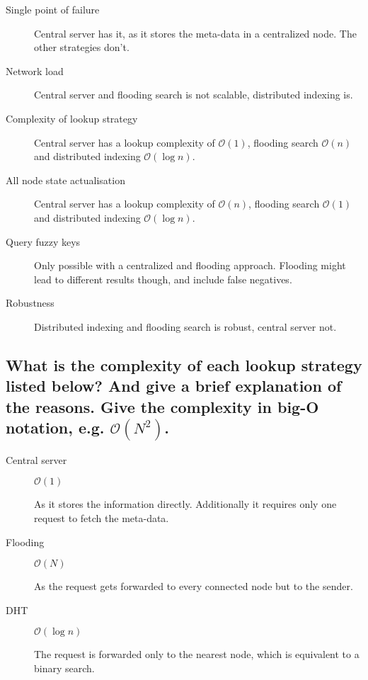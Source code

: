 \documentclass{article}
\begin{document}
\begin{description}
  \item[Single point of failure]

    Central server has it, as it stores the meta-data in a centralized node. The
    other strategies don't.

  \item[Network load]

    Central server and flooding search is not scalable, distributed indexing is.

  \item[Complexity of lookup strategy]

    Central server has a lookup complexity of $\mathcal{O}(1)$, flooding search
    $\mathcal{O}(n)$ and distributed indexing $\mathcal{O}(\log{}n)$.

  \item[All node state actualisation]

    Central server has a lookup complexity of $\mathcal{O}(n)$, flooding search
    $\mathcal{O}(1)$ and distributed indexing $\mathcal{O}(\log{}n)$.

  \item[Query fuzzy keys]

    Only possible with a centralized and flooding approach. Flooding might lead
    to different results though, and include false negatives.

  \item[Robustness]

    Distributed indexing and flooding search is robust, central server not.

\end{description}

\subsection{What is the complexity of each lookup strategy listed below? And
give a brief explanation of the reasons. Give the complexity in big-O notation,
e.g. $\mathcal{O}(N^2)$.}

\begin{description}
  \item[Central server]

    $\mathcal{O}(1)$

    As it stores the information directly. Additionally it requires only one
    request to fetch the meta-data.

  \item[Flooding]

    $\mathcal{O}(N)$

    As the request gets forwarded to every connected node but to the sender.

  \item[DHT]

    $\mathcal{O}(\log{}n)$

    The request is forwarded only to the nearest node, which is equivalent to a
    binary search.

\end{description}
\end{document}
